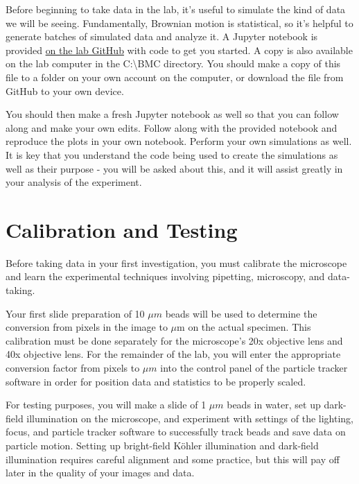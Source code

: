 \documentclass{../lab}
\begin{document}
Before beginning to take data in the lab, it's useful to simulate the kind of data we will be seeing. Fundamentally, Brownian motion is statistical, so it's helpful to generate batches of simulated data and analyze it. A Jupyter notebook is provided \href{https://github.com/berkeley-physics111b/BMC/blob/main/brownian_simulation.ipynb}{on the lab GitHub} with code to get you started. A copy is also available on the lab computer in the C:\textbackslash BMC directory. You should make a copy of this file to a folder on your own account on the computer, or download the file from GitHub to your own device. 

You should then make a fresh Jupyter notebook as well so that you can follow along and make your own edits. Follow along with the provided notebook and reproduce the plots in your own notebook. Perform your own simulations as well. It is key that you understand the code being used to create the simulations as well as their purpose - you will be asked about this, and it will assist greatly in your analysis of the experiment.


\section{Calibration and Testing}
\label{sec:CalibrationAndTesting}

Before taking data in your first investigation, you must calibrate the microscope and learn the experimental techniques involving pipetting, microscopy, and data-taking.

Your first slide preparation of 10 $\mu m$ beads will be used to determine the conversion from pixels in the image to $\mu$m on the actual specimen. This calibration must be done separately for the microscope's 20x objective lens and 40x objective lens. For the remainder of the lab, you will enter the appropriate conversion factor from pixels to $\mu m$ into the control panel of the particle tracker software in order for position data and statistics to be properly scaled.

For testing purposes, you will make a slide of 1 $\mu m$ beads in water, set up dark-field illumination on the microscope, and experiment with settings of the lighting, focus, and particle tracker software to successfully track beads and save data on particle motion. Setting up bright-field K\"ohler illumination and dark-field illumination requires careful alignment and some practice, but this will pay off later in the quality of your images and data.
\end{document}
